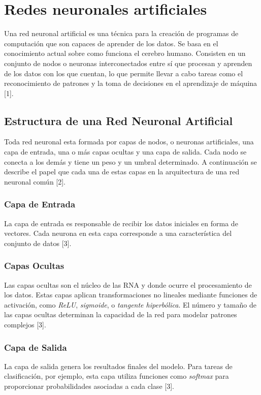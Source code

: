 
\section{Redes neuronales artificiales}

Una red neuronal artificial es una técnica para la creación de programas de computación que son capaces de aprender de los datos. Se basa en el conocimiento actual sobre como funciona el cerebro humano. 
Consisten en un conjunto de nodos o neuronas interconectados entre sí que procesan y aprenden de los datos con los que cuentan, lo que permite llevar a cabo tareas como el reconocimiento de patrones y la toma de decisiones en el aprendizaje de máquina [1].


\subsection{Estructura de una Red Neuronal Artificial}
Toda red neuronal esta formada por capas de nodos, o neuronas artificiales, una capa de entrada, una o más capas ocultas y una capa de salida. Cada nodo se conecta a los demás y tiene un peso y un umbral determinado.
A continuación se describe el papel que cada una de estas capas en la arquitectura de una red neuronal común [2].

\subsubsection{Capa de Entrada}
La capa de entrada es responsable de recibir los datos iniciales en forma de vectores. Cada neurona en esta capa corresponde a una característica del conjunto de datos [3].

\subsubsection{Capas Ocultas}
Las capas ocultas son el núcleo de las RNA y donde ocurre el procesamiento de los datos. Estas capas aplican transformaciones no lineales mediante funciones de activación, como \textit{ReLU}, \textit{sigmoide}, o \textit{tangente hiperbólica}. El número y tamaño de las capas ocultas determinan la capacidad de la red para modelar patrones complejos [3].

\subsubsection{Capa de Salida}
La capa de salida genera los resultados finales del modelo. Para tareas de clasificación, por ejemplo, esta capa utiliza funciones como \textit{softmax} para proporcionar probabilidades asociadas a cada clase [3].

